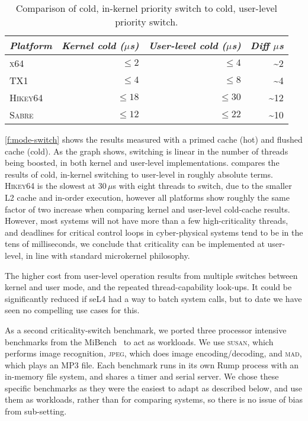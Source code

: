 \begin{table}[t]\centering
    \begin{tabular}{lrrr}\toprule
        \emph{Platform}     & \emph{Kernel cold ($\mu$s)} & \emph{User-level cold ($\mu$s)} & \emph{Diff $\mu$s} \\\midrule
        \textsc{x64}    & $\leq2$ & $\leq4$ & \textasciitilde2 \\
        \textsc{TX1}    & $\leq4$ & $\leq8$ & \textasciitilde4 \\
        \textsc{Hikey64}    & $\leq18$ & $\leq30$ & \textasciitilde12 \\
        \textsc{Sabre}    & $\leq12$ & $\leq22$ & \textasciitilde10 \\
        \bottomrule
\end{tabular}
\caption[Comparison of kernel and user-level priority switches]{Comparison of cold, in-kernel
priority switch to cold, user-level priority switch.}
\label{t:cold-prio-switch}
\end{table}


\autoref{f:mode-switch} shows the results measured with a primed cache (hot) and flushed cache (cold).
As the graph shows, switching is linear in the number of threads being boosted, in both kernel and
user-level implementations.
 compares the results of cold, in-kernel switching to user-level in roughly
absolute terms. \textsc{Hikey64} is the slowest at 30\,\(\mu\)s with eight threads to switch,
due to the smaller L2 cache and
in-order execution, however all platforms show roughly the same factor of two increase when
comparing kernel and user-level cold-cache results.
However, most systems will not have more than a few high-criticality threads, and deadlines for critical control loops in
cyber-physical systems tend to be in the tens of milliseconds, we
conclude that criticality can be implemented at user-level, in line with standard microkernel philosophy.

The higher cost from user-level operation results from  multiple
switches between kernel and user mode, and the repeated
thread-capability look-ups. It could be significantly reduced if seL4
had a way to batch system calls, but to date we have seen no compelling use cases for this.

As a second criticality-switch benchmark, we ported three processor intensive 
benchmarks from the MiBench~\citep{Guthaus_REAMB_01} to act as workloads. 
We use \textsc{susan}, which performs image recognition, \textsc{jpeg}, which does image
encoding/decoding, and \textsc{mad}, which plays an MP3 file.
Each benchmark runs in its own Rump process
with an in-memory file system, and shares a timer and serial server.
 We chose these specific
benchmarks as they were the easiest to adapt as described below, and use them as workloads,
rather than for comparing systems, so there is no issue of bias from sub-setting.

